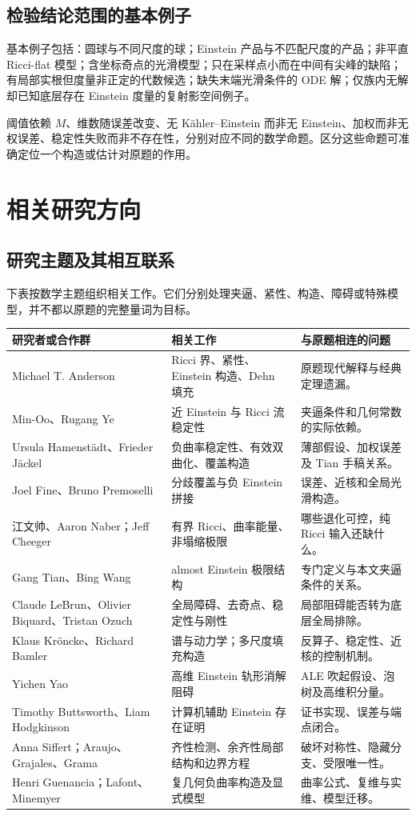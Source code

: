 \documentclass[11pt,a4paper]{article}
\theoremstyle{definition}
\begin{document}
\subsection{检验结论范围的基本例子}

基本例子包括：圆球与不同尺度的球；Einstein 产品与不匹配尺度的产品；非平直 Ricci-flat 模型；含坐标奇点的光滑模型；只在采样点小而在中间有尖峰的缺陷；有局部实根但度量非正定的代数候选；缺失末端光滑条件的 ODE 解；仅族内无解却已知底层存在 Einstein 度量的复射影空间例子。

阈值依赖 $M$、维数随误差改变、无 Kähler--Einstein 而非无 Einstein、加权而非无权误差、稳定性失败而非不存在性，分别对应不同的数学命题。区分这些命题可准确定位一个构造或估计对原题的作用。

\section{相关研究方向}

\subsection{研究主题及其相互联系}

下表按数学主题组织相关工作。它们分别处理夹逼、紧性、构造、障碍或特殊模型，并不都以原题的完整量词为目标。

\begin{longtable}{P{0.30\textwidth}P{0.34\textwidth}P{0.27\textwidth}}
\toprule
研究者或合作群 & 相关工作 & 与原题相连的问题\\\midrule\endhead
Michael T. Anderson & Ricci 界、紧性、Einstein 构造、Dehn 填充 & 原题现代解释与经典定理遗漏。\\
Min-Oo、Rugang Ye & 近 Einstein 与 Ricci 流稳定性 & 夹逼条件和几何常数的实际依赖。\\
Ursula Hamenstädt、Frieder Jäckel & 负曲率稳定性、有效双曲化、覆盖构造 & 薄部假设、加权误差及 Tian 手稿关系。\\
Joel Fine、Bruno Premoselli & 分歧覆盖与负 Einstein 拼接 & 误差、近核和全局光滑构造。\\
江文帅、Aaron Naber；Jeff Cheeger & 有界 Ricci、曲率能量、非塌缩极限 & 哪些退化可控，纯 Ricci 输入还缺什么。\\
Gang Tian、Bing Wang & almost Einstein 极限结构 & 专门定义与本文夹逼条件的关系。\\
Claude LeBrun、Olivier Biquard、Tristan Ozuch & 全局障碍、去奇点、稳定性与刚性 & 局部阻碍能否转为底层全局排除。\\
Klaus Kröncke、Richard Bamler & 谱与动力学；多尺度填充构造 & 反算子、稳定性、近核的控制机制。\\
Yichen Yao & 高维 Einstein 轨形消解阻碍 & ALE 吹起假设、泡树及高维积分量。\\
Timothy Buttsworth、Liam Hodgkinson & 计算机辅助 Einstein 存在证明 & 证书实现、误差与端点闭合。\\
Anna Siffert；Araujo、Grajales、Grama & 齐性检测、余齐性局部结构和边界方程 & 破坏对称性、隐藏分支、受限唯一性。\\
Henri Guenancia；Lafont、Minemyer & 复几何负曲率构造及显式模型 & 曲率公式、复维与实维、模型迁移。\\\bottomrule
\end{longtable}
\end{document}
